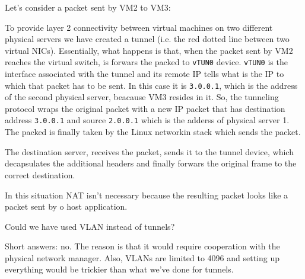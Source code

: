 \begin{eg}
    Let's consider a packet sent by VM2 to VM3:

    \begin{figure}[h!]
        \centering
    \end{figure}

    \noindent
    To provide layer 2 connectivity between virtual machines on two different
    physical servers we have created a tunnel (i.e. the red dotted line between
    two virtual NICs). Essentially, what happens is that, when the packet sent
    by VM2 reaches the virtual switch, is forwars the packed to \texttt{vTUN0}
    device. \texttt{vTUN0} is the interface associated with the tunnel and its
    remote IP tells what is the IP to which that packet has to be sent. In this
    case it is \texttt{3.0.0.1}, which is the address of the second physical
    server, beacause VM3 resides in it. So, the tunneling protocol wraps the
    original packet with a new IP packet that has destination address
    \texttt{3.0.0.1} and source \texttt{2.0.0.1} which is the adderss of physical
    server 1. The packed is finally taken by the Linux networkin stack which
    sends the packet.

    The destination server, receives the packet, sends it to the tunnel
    device, which decapsulates the additional headers and finally forwars the
    original frame to the correct destination.
\end{eg}
\begin{note}
    In this situation NAT isn't necessary because the resulting packet looks
    like a packet sent by o host application.
\end{note}

\noindent
Could we have used VLAN instead of tunnels?

Short answers: no. The reason is that it would require cooperation with the
physical network manager. Also, VLANs are limited to 4096 and setting up
everything would be trickier than what we've done for tunnels.